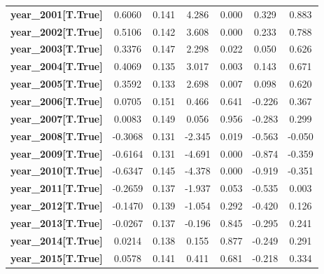 \begin{center}
\begin{tabular}{lcccccc}
\textbf{year\_2001[T.True]} &       0.6060  &        0.141     &     4.286  &         0.000        &        0.329    &        0.883     \\
\textbf{year\_2002[T.True]} &       0.5106  &        0.142     &     3.608  &         0.000        &        0.233    &        0.788     \\
\textbf{year\_2003[T.True]} &       0.3376  &        0.147     &     2.298  &         0.022        &        0.050    &        0.626     \\
\textbf{year\_2004[T.True]} &       0.4069  &        0.135     &     3.017  &         0.003        &        0.143    &        0.671     \\
\textbf{year\_2005[T.True]} &       0.3592  &        0.133     &     2.698  &         0.007        &        0.098    &        0.620     \\
\textbf{year\_2006[T.True]} &       0.0705  &        0.151     &     0.466  &         0.641        &       -0.226    &        0.367     \\
\textbf{year\_2007[T.True]} &       0.0083  &        0.149     &     0.056  &         0.956        &       -0.283    &        0.299     \\
\textbf{year\_2008[T.True]} &      -0.3068  &        0.131     &    -2.345  &         0.019        &       -0.563    &       -0.050     \\
\textbf{year\_2009[T.True]} &      -0.6164  &        0.131     &    -4.691  &         0.000        &       -0.874    &       -0.359     \\
\textbf{year\_2010[T.True]} &      -0.6347  &        0.145     &    -4.378  &         0.000        &       -0.919    &       -0.351     \\
\textbf{year\_2011[T.True]} &      -0.2659  &        0.137     &    -1.937  &         0.053        &       -0.535    &        0.003     \\
\textbf{year\_2012[T.True]} &      -0.1470  &        0.139     &    -1.054  &         0.292        &       -0.420    &        0.126     \\
\textbf{year\_2013[T.True]} &      -0.0267  &        0.137     &    -0.196  &         0.845        &       -0.295    &        0.241     \\
\textbf{year\_2014[T.True]} &       0.0214  &        0.138     &     0.155  &         0.877        &       -0.249    &        0.291     \\
\textbf{year\_2015[T.True]} &       0.0578  &        0.141     &     0.411  &         0.681        &       -0.218    &        0.334     \\

\end{tabular}
\end{center}
